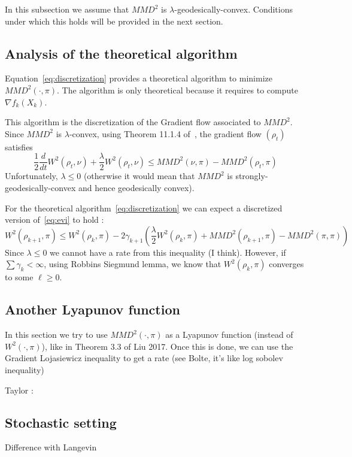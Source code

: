 In this subsection we assume that $MMD^2$ is $\lambda$-geodesically-convex. Conditions under which this holds will be provided in the next section.

\subsection{Analysis of the theoretical algorithm}

Equation~\eqref{eq:discretization} provides a theoretical algorithm to minimize $MMD^2(\cdot,\pi)$. The algorithm is only theoretical because it requires to compute $\nabla f_k(X_k)$.

This algorithm is the discretization of the Gradient flow associated to $MMD^2$. Since $MMD^2$ is $\lambda$-convex, using Theorem 11.1.4 of~\cite{ambrosio2008gradients}, the gradient flow $(\rho_t)$ satisfies
\begin{equation}
    \label{eq:evi}
    \frac12 \frac{d}{dt} W^2(\rho_t,\nu) + \frac{\lambda}{2}W^2(\rho_t,\nu) \leq MMD^2(\nu,\pi) - MMD^2(\rho_t,\pi)
\end{equation}
Unfortunately, $\lambda \leq 0$ (otherwise it would mean that $MMD^2$ is strongly-geodesically-convex and hence geodesically convex).

For the theoretical algorithm~\eqref{eq:discretization} we can expect a discretized version of~\eqref{eq:evi} to hold : 
\begin{equation}
    \label{eq:evi-discrete}
    W^2(\rho_{k+1},\pi) \leq  W^2(\rho_{k},\pi) -2\gamma_{k+1}\left( \frac{\lambda}{2}W^2(\rho_{k},\pi) + MMD^2(\rho_{k+1},\pi) - MMD^2(\pi,\pi)\right)
\end{equation}
Since $\lambda \leq 0$ we cannot have a rate from this inequality (I think).
However, if $\sum \gamma_k < \infty$, using Robbins Siegmund lemma, we know that $W^2(\rho_{k},\pi)$ converges to some $\ell \geq 0$. 

\subsection{Another Lyapunov function}

In this section we try to use $MMD^2(\cdot,\pi)$ as a Lyapunov function (instead of $W^2(\cdot,\pi)$), like in Theorem 3.3 of Liu 2017. Once this is done, we can use the Gradient Lojasiewicz inequality to get a rate (see Bolte, it's like log sobolev inequality)

Taylor : 


\subsection{Stochastic setting}

Difference with Langevin
